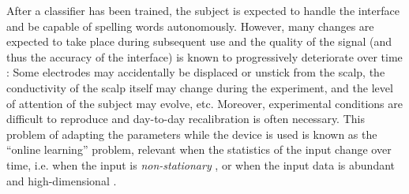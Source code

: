 \documentclass[conference]{IEEEtran}
\begin{document}
After a classifier has been trained, the subject is expected to handle the interface and be capable
of spelling words autonomously.
However, many changes are expected to take place during subsequent use and
the quality of the signal (and 
thus the accuracy of the interface) is known to progressively deteriorate over time \cite{Shenoy2006}:
Some electrodes may accidentally be displaced or unstick from the scalp, the conductivity of the scalp itself 
may change during the experiment, 
and the level of attention of the subject may evolve, etc. Moreover, experimental 
conditions are difficult to reproduce
and day-to-day recalibration is often necessary.
This problem of adapting the parameters while the device is used 
is known as the ``online learning'' problem, relevant when the statistics of the input change over time, i.e. when 
the input is \emph{non-stationary} \cite{Kivinen08}, or
when the input data is abundant and high-dimensional \cite{Bottou03}.
\end{document}
